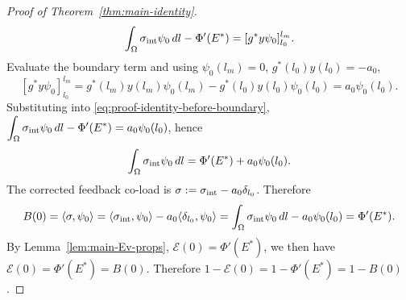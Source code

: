 \documentclass[pdflatex,sn-mathphys-num]{sn-jnl}
\theoremstyle{thmstyleone}
\theoremstyle{definition}
\theoremstyle{remark}
\newcommand{\Om}{\Omega}
\newcommand{\Ev}{\mathcal{E}}
\numberwithin{equation}{section}
\begin{document}
\begin{proof}[Proof of Theorem~\ref{thm:main-identity}]
\begin{equation}
\label{eq:proof-identity-before-boundary}
\int_{\Om}\sigma_{\rm int}\psi_0\,dl-\Phi'(E^*)
=
[g^*y\psi_0]_{l_0}^{l_m}.
\end{equation}
Evaluate the boundary term and using $\psi_0(l_m)=0$, $g^*(l_0)y(l_0)=-a_0$,
\[
[g^*y\psi_0]_{l_0}^{l_m}
=
g^*(l_m)y(l_m)\psi_0(l_m)
-
g^*(l_0)y(l_0)\psi_0(l_0)=a_0\psi_0(l_0).
\]
Substituting into \eqref{eq:proof-identity-before-boundary},
$\displaystyle 
\int_{\Om}\sigma_{\rm int}\psi_0\,dl-\Phi'(E^*)
=
a_0\psi_0(l_0)$,
hence
\begin{equation}
\label{eq:proof-identity-interior-load}
\int_{\Om}\sigma_{\rm int}\psi_0\,dl
=
\Phi'(E^*)+a_0\psi_0(l_0).
\end{equation}
The corrected feedback co-load is
$\displaystyle 
\sigma:=\sigma_{\rm int}-a_0\delta_{l_0}$.
Therefore
\[ 
B(0)
=
\langle\sigma,\psi_0\rangle
=
\langle\sigma_{\rm int},\psi_0\rangle
-
a_0\langle\delta_{l_0},\psi_0\rangle=
\int_{\Om}\sigma_{\rm int}\psi_0\,dl
-
a_0\psi_0(l_0) = \Phi'(E^*).
\]
By Lemma~\ref{lem:main-Ev-props},
$\Ev(0)=\Phi'(E^*)$, we then have
$\Ev(0)=\Phi'(E^*)=B(0)$.
Therefore
$\displaystyle 
1-\Ev(0)
=
1-\Phi'(E^*)
=
1-B(0)$.
\end{proof}
\end{document}
